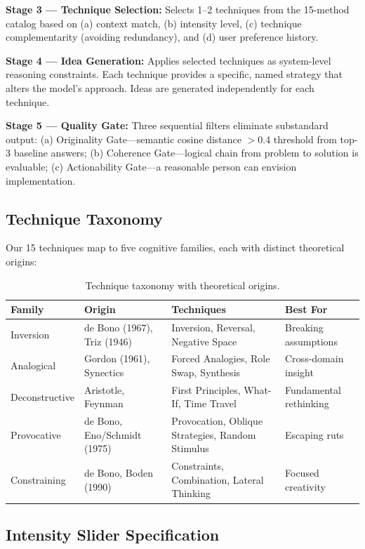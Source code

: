 \documentclass[11pt,a4paper]{article}
\begin{document}
\textbf{Stage 3 — Technique Selection:} Selects 1--2 techniques from the 15-method catalog based on (a) context match, (b) intensity level, (c) technique complementarity (avoiding redundancy), and (d) user preference history.

\textbf{Stage 4 — Idea Generation:} Applies selected techniques as system-level reasoning constraints. Each technique provides a specific, named strategy that alters the model's approach. Ideas are generated independently for each technique.

\textbf{Stage 5 — Quality Gate:} Three sequential filters eliminate substandard output: (a) Originality Gate---semantic cosine distance $>$0.4 threshold from top-3 baseline answers; (b) Coherence Gate---logical chain from problem to solution is evaluable; (c) Actionability Gate---a reasonable person can envision implementation.

\subsection{Technique Taxonomy}

Our 15 techniques map to five cognitive families, each with distinct theoretical origins:

\begin{table}[H]
\centering
\begin{tabular}{@{}llll@{}}
\toprule
\textbf{Family} & \textbf{Origin} & \textbf{Techniques} & \textbf{Best For} \\
\midrule
Inversion & de Bono (1967), Triz (1946) & Inversion, Reversal, Negative Space & Breaking assumptions \\
Analogical & Gordon (1961), Synectics & Forced Analogies, Role Swap, Synthesis & Cross-domain insight \\
Deconstructive & Aristotle, Feynman & First Principles, What-If, Time Travel & Fundamental rethinking \\
Provocative & de Bono, Eno/Schmidt (1975) & Provocation, Oblique Strategies, Random Stimulus & Escaping ruts \\
Constraining & de Bono, Boden (1990) & Constraints, Combination, Lateral Thinking & Focused creativity \\
\bottomrule
\end{tabular}
\caption{Technique taxonomy with theoretical origins.}
\label{tab:taxonomy}
\end{table}

\subsection{Intensity Slider Specification}
\end{document}
